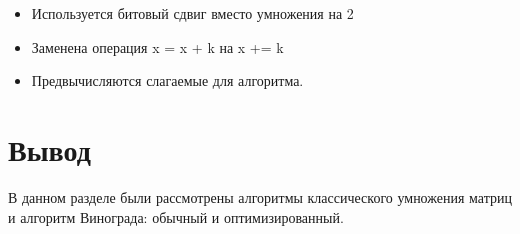 \begin{itemize}

\item Используется битовый сдвиг вместо умножения на 2
\item Заменена операция x = x + k на x += k 
\item Предвычисляются слагаемые для алгоритма.
\end{itemize}

\section*{Вывод}

В данном разделе были рассмотрены алгоритмы классического умножения матриц и алгоритм Винограда: обычный и оптимизированный.